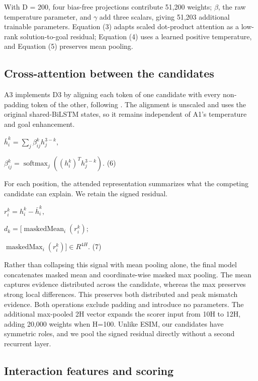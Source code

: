 \documentclass[11pt]{article}
\begin{document}
With D = 200, four bias-free projections contribute 51,200 weights; $\beta$, the raw temperature parameter, and $\gamma$ add three scalars, giving 51,203 additional trainable parameters. Equation (3) adapts scaled dot-product attention \citep{vaswani2017attention} as a low-rank solution-to-goal residual; Equation (4) uses a learned positive temperature, and Equation (5) preserves mean pooling.

\subsection{Cross-attention between the candidates}

A3 implements D3 by aligning each token of one candidate with every non-padding token of the other, following \citet{chen2017esim}. The alignment is unscaled and uses the original shared-BiLSTM states, so it remains independent of A1's temperature and goal enhancement.

${\bar{h}}_{i}^{k} = {\sum }_{j}{\beta }_{ij}^{k}{h}_{j}^{3-k},$

${\beta }_{ij}^{k} = {\operatorname{softmax}}_{j}\left( {\left( {h}_{i}^{k} \right)}^{T}{h}_{j}^{3-k} \right).$ (6)

For each position, the attended representation summarizes what the competing candidate can explain. We retain the signed residual.

${r}_{i}^{k} = {h}_{i}^{k} - {\bar{h}}_{i}^{k},$

${d}_{k} = [{\operatorname{maskedMean}}_{i}\left( {r}_{i}^{k} \right);$

${\operatorname{maskedMax}}_{i}\left( {r}_{i}^{k} \right)] \in {R}^{4H}.$ (7)

Rather than collapsing this signal with mean pooling alone, the final model concatenates masked mean and coordinate-wise masked max pooling. The mean captures evidence distributed across the candidate, whereas the max preserves strong local differences. This preserves both distributed and peak mismatch evidence. Both operations exclude padding and introduce no parameters. The additional max-pooled 2H vector expands the scorer input from 10H to 12H, adding 20,000 weights when H=100. Unlike ESIM, our candidates have symmetric roles, and we pool the signed residual directly without a second recurrent layer.

\subsection{Interaction features and scoring}
\end{document}
